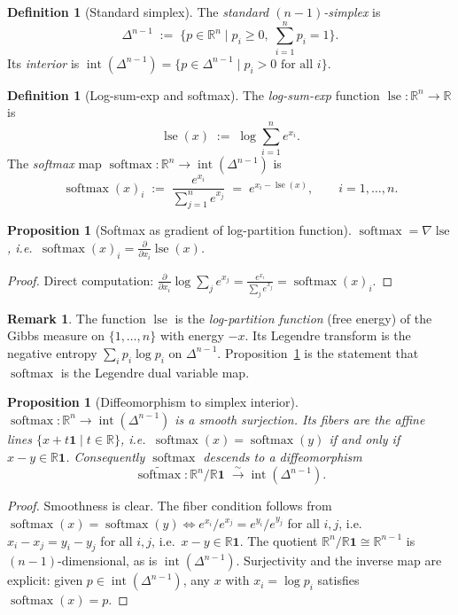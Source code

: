 \documentclass[11pt]{amsart}
\theoremstyle{plain}
\newtheorem{proposition}[theorem]{Proposition}
\theoremstyle{definition}
\newtheorem{definition}[theorem]{Definition}
\newtheorem{remark}[theorem]{Remark}
\newcommand{\R}{\mathbb{R}}
\newcommand{\simplex}[1]{\Delta^{#1}}   %
\newcommand{\softmax}{\operatorname{softmax}}
\newcommand{\logsumexp}{\operatorname{lse}}
\begin{document}
\begin{definition}[Standard simplex]
The \emph{standard $(n-1)$-simplex} is
\[
    \simplex{n-1} \;:=\; \bigl\{ p \in \R^n \;\big|\; p_i \geq 0,\;
    \textstyle\sum_{i=1}^n p_i = 1 \bigr\}.
\]
Its \emph{interior} is
$\operatorname{int}(\simplex{n-1}) = \{ p \in \simplex{n-1} \mid p_i > 0
\text{ for all } i \}$.
\end{definition}

\begin{definition}[Log-sum-exp and softmax]
\label{def:softmax}
The \emph{log-sum-exp} function $\logsumexp : \R^n \to \R$ is
\[
    \logsumexp(x) \;:=\; \log \sum_{i=1}^n e^{x_i}.
\]
The \emph{softmax} map $\softmax : \R^n \to \operatorname{int}(\simplex{n-1})$
is
\[
    \softmax(x)_i \;:=\; \frac{e^{x_i}}{\sum_{j=1}^n e^{x_j}}
    \;=\; e^{x_i - \logsumexp(x)}, \qquad i = 1,\ldots,n.
\]
\end{definition}

\begin{proposition}[Softmax as gradient of log-partition function]
\label{prop:softmax-gradient}
$\softmax = \nabla \logsumexp$, i.e.\
$\softmax(x)_i = \frac{\partial}{\partial x_i} \logsumexp(x)$.
\end{proposition}
\begin{proof}
Direct computation:
$\frac{\partial}{\partial x_i} \log \sum_j e^{x_j}
= \frac{e^{x_i}}{\sum_j e^{x_j}} = \softmax(x)_i$.
\end{proof}

\begin{remark}
The function $\logsumexp$ is the \emph{log-partition function} (free energy)
of the Gibbs measure on $\{1,\ldots,n\}$ with energy $-x$.  Its Legendre
transform is the negative entropy $\sum_i p_i \log p_i$ on $\simplex{n-1}$.
Proposition~\ref{prop:softmax-gradient} is the statement that $\softmax$ is
the Legendre dual variable map.
\end{remark}

\begin{proposition}[Diffeomorphism to simplex interior]
\label{prop:softmax-diffeo}
$\softmax : \R^n \to \operatorname{int}(\simplex{n-1})$ is a smooth surjection.
Its fibers are the affine lines $\{ x + t \mathbf{1} \mid t \in \R \}$, i.e.\
$\softmax(x) = \softmax(y)$ if and only if $x - y \in \R \mathbf{1}$.
Consequently $\softmax$ descends to a diffeomorphism
\[
    \widetilde{\softmax} : \R^n / \R\mathbf{1} \;\xrightarrow{\;\sim\;}
    \operatorname{int}(\simplex{n-1}).
\]
\end{proposition}
\begin{proof}
Smoothness is clear.  The fiber condition follows from $\softmax(x) = \softmax(y)
\Leftrightarrow e^{x_i}/e^{x_j} = e^{y_i}/e^{y_j}$ for all $i,j$, i.e.\
$x_i - x_j = y_i - y_j$ for all $i,j$, i.e.\ $x - y \in \R\mathbf{1}$.
The quotient $\R^n/\R\mathbf{1} \cong \R^{n-1}$ is $(n-1)$-dimensional, as is
$\operatorname{int}(\simplex{n-1})$.  Surjectivity and the inverse map are
explicit: given $p \in \operatorname{int}(\simplex{n-1})$, any $x$ with
$x_i = \log p_i$ satisfies $\softmax(x) = p$.
\end{proof}
\end{document}
